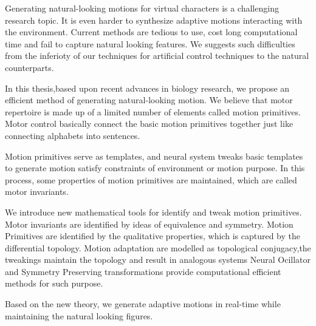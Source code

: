 


\begin{abstracts}        %

Generating natural-looking motions for virtual characters is a challenging research topic.
It is even harder to synthesize adaptive motions interacting with the environment. 
Current methods are tedious to use, cost long computational time and fail to capture natural looking features.
We suggests such difficulties from the inferioty of our techniques for artificial control techniques to the natural counterparts.

In this thesis,based upon recent advances in biology research, we propose an efficient method of generating natural-looking motion. 
We believe that motor repertoire is made up of a limited number of elements called motion primitives. 
Motor control basically connect the basic motion primitives together just like connecting alphabets into sentences.


Motion primitives serve as templates, and neural system tweaks basic templates to generate motion satisfy constraints of environment or motion purpose.
In this process, some properties of motion primitives are maintained, which are called motor invariants.


We introduce new mathematical tools for identify and tweak motion primitives.
Motor invariants are identified by ideas of equivalence and symmetry.
Motion Primitives are identified by the qualitative properties, which is captured by the differential topology.
Motion adaptation are modelled as topological conjugacy,the tweakings maintain the topology and result in analogous systems
Neural Ocillator and Symmetry Preserving transformations provide computational efficient methods for such purpose.

Based on the new theory, we generate adaptive motions in real-time while maintaining the natural looking figures.

\end{abstracts}





